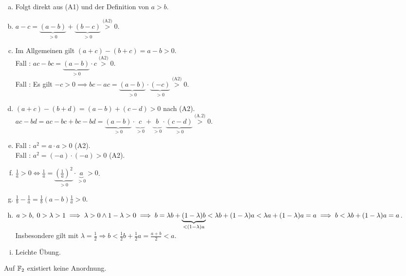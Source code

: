 \documentclass[../ana1.tex]{subfiles}
\begin{document}
\begin{bew}\leavevmode
	\begin{enumerate}[(a)]
		\item Folgt direkt aus (A1) und der Definition von \(a > b \).
		\item \(a - c = \underbrace{(a - b)}_{> 0} + \underbrace{(b - c)}_{> 0} \overset{\text{(A2)}}{>} 0 \).
		\item Im Allgemeinen gilt \((a + c) - (b + c) = a - b > 0 \). \\
			  Fall : \(ac - bc = \underbrace{(a - b)}_{> 0} \cdot c \overset{\text{(A2)}}{>}0 \). \\
			  Fall : Es gilt \(\minus c > 0 \implies bc - ac = \underbrace{(a - b)}_{> 0} \cdot \underbrace{(\minus c)}_{> 0} \overset{\text{(A2)}}{>} 0 \).
		\item \((a+c)-(b+d) = (a-b)+(c-d)>0 \) nach (A2). \\
		      \(ac-bd=ac-bc+bc-bd=\underbrace{(a-b)}_{>0} \cdot \underbrace{\phantom{(}c\phantom{)}}_{>0} + \underbrace{\phantom{(}b\phantom{)}}_{>0} \cdot \underbrace{(c-d)}_{>0} \overset{\text{(A.2)}}{>}0 \).
		\item Fall : \(a^2 = a\cdot a > 0 \) (A2). \\
			  Fall : \(a^2 = (-a)\cdot(-a) > 0 \) (A2).
		\item \(\frac{1}{a} > 0 \iff \frac{1}{a} = \underbrace{{\left(\frac{1}{a}\right)}^2}_{>0} \cdot \underbrace{a}_{>0} > 0 \).
		\item \(\frac{1}{b} - \frac{1}{a} = \frac{1}{b}(a - b)\frac{1}{a} > 0 \).
		\item \(a > b,  \; 0 > \lambda > 1 \implies \lambda > 0 \wedge 1 - \lambda > 0 \\
			  \implies b = \lambda b + \underbrace{(1 - \lambda)b}_{< (1 - \lambda)a} < \lambda b + (1 - \lambda) a < \lambda a + (1 - \lambda)a = a \\
			  \implies b < \lambda b + (1 - \lambda)a = a \). \\
			  Insbesondere gilt mit \(\lambda = \frac{1}{2} \Rightarrow b < \frac{1}{2} b + \frac{1}{2}a = \frac{a + b}{2} < a \).
		\item Leichte Übung.\qedhere
	\end{enumerate}
\end{bew}

\begin{bem}
	Auf \(\mathbb{F}_2 \) existiert keine Anordnung.
\end{bem}
\end{document}
